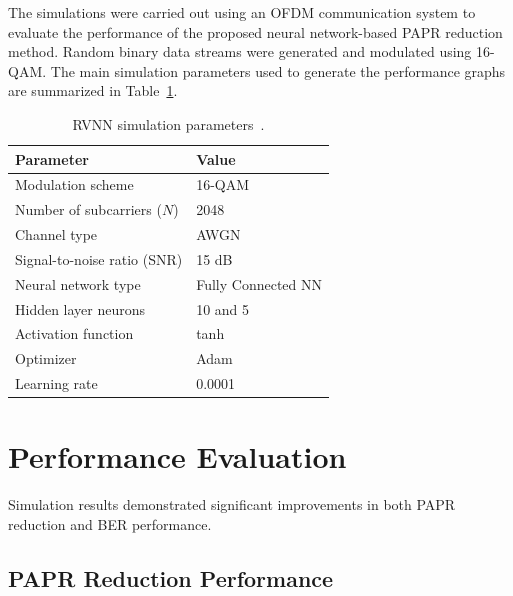 The simulations were carried out using an OFDM communication system to evaluate the performance of the proposed neural network-based PAPR reduction method. Random binary data streams were generated and modulated using 16-QAM. The main simulation parameters used to generate the performance graphs are summarized in Table~\ref{tab:sim_params}.

\begin{table}[H]
    \centering
    \caption{RVNN simulation parameters~\cite{liu2020low}.}
    \label{tab:sim_params}
    \begin{tabular}{@{} l l @{}}
        \toprule
        \textbf{Parameter}          & \textbf{Value}     \\
        \midrule
        Modulation scheme           & 16-QAM             \\
        Number of subcarriers ($N$) & 2048               \\
        Channel type                & AWGN               \\
        Signal-to-noise ratio (SNR) & 15 dB              \\
        Neural network type         & Fully Connected NN \\
        Hidden layer neurons        & 10 and 5           \\
        Activation function         & tanh               \\
        Optimizer                   & Adam               \\
        Learning rate               & 0.0001             \\
        \bottomrule
    \end{tabular}
\end{table}

\section{Performance Evaluation}

Simulation results demonstrated significant improvements in both PAPR reduction and BER performance.

\subsection{PAPR Reduction Performance}

